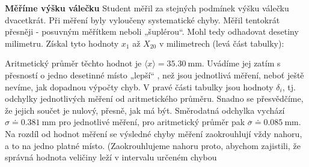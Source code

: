 \wikitextrule
\begin{example}\label{mai:exam077}
  \textbf{Měříme výšku válečku}\newline\small
  Student měřil za stejných podmínek výšku válečku dvacetkrát. Při měření byly vyloučeny 
  systematické chyby. Měřil tentokrát přesněji - posuvným měřítkem neboli „šuplérou“. Mohl tedy 
  odhadovat desetiny milimetru. Získal tyto hodnoty \(x_1\) až \(X_{20}\) v milimetrech (levá část 
  tabulky):
  
  \begin{table}[ht!]
    \centering
  \end{table}
  Aritmetický průměr těchto hodnot je \(\langle x\rangle = \SI{35.30}{\mm}\). Uvádíme jej zatím s 
  přesností o jedno desetinné místo „lepší“ , než jsou jednotlivá měření, neboť ještě nevíme, jak 
  dopadnou výpočty chyb. V pravé části tabulky jsou hodnoty \(\delta_i\), tj. odchylky jednotlivých 
  měření od aritmetického průměru. Snadno se přesvědčíme, že jejich součet je nulový, přesně, jak 
  má být. Směrodatná odchylka vychází \(\sigma \doteq \SI{0.381}{\mm}\) pro jednotlivé měření, pro 
  aritmetický průměr pak \(\overline{\sigma} \doteq \SI{0.085}{\mm}\). Na rozdíl od hodnot měření 
  se výsledné chyby měření zaokrouhlují vždy nahoru, a to na jedno platné místo. (Zaokrouhlujeme 
  nahoru proto, abychom zajistili, že správná hodnota veličiny leží v intervalu určeném chybou 

\end{example}

